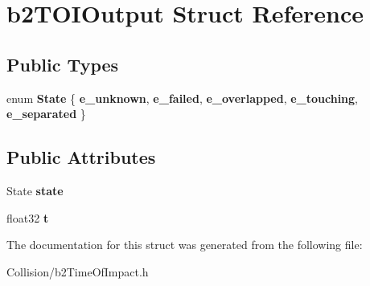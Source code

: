 \hypertarget{structb2TOIOutput}{}\section{b2\+T\+O\+I\+Output Struct Reference}
\label{structb2TOIOutput}
\subsection*{Public Types}
\begin{DoxyCompactItemize}
\item 
\mbox{\label{structb2TOIOutput_a12c3cf4dc0551f5c8249dc1dd867959a}} 
enum {\bfseries State} \{ \newline
{\bfseries e\+\_\+unknown}, 
{\bfseries e\+\_\+failed}, 
{\bfseries e\+\_\+overlapped}, 
{\bfseries e\+\_\+touching}, 
\newline
{\bfseries e\+\_\+separated}
 \}
\end{DoxyCompactItemize}
\subsection*{Public Attributes}
\begin{DoxyCompactItemize}
\item 
\mbox{\label{structb2TOIOutput_aaacbf28f437b965ffecabf1407a77915}} 
State {\bfseries state}
\item 
\mbox{\label{structb2TOIOutput_a94f8b756e060892226ec006db4be7ee3}} 
float32 {\bfseries t}
\end{DoxyCompactItemize}


The documentation for this struct was generated from the following file\+:\begin{DoxyCompactItemize}
\item 
Collision/b2\+Time\+Of\+Impact.\+h\end{DoxyCompactItemize}
